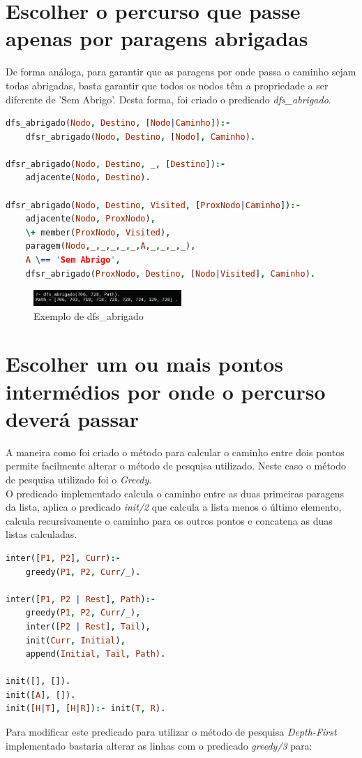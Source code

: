 \documentclass[a4paper]{report}
\begin{document}
\section{Escolher o percurso que passe apenas por paragens abrigadas}
De forma análoga, para garantir que as paragens por onde passa o caminho sejam
todas abrigadas, basta garantir que todos os nodos têm a propriedade a ser
diferente de 'Sem Abrigo'. Desta forma, foi criado o predicado
\textit{dfs\_abrigado}.\\

\begin{lstlisting}[language=Prolog]
dfs_abrigado(Nodo, Destino, [Nodo|Caminho]):-
    dfsr_abrigado(Nodo, Destino, [Nodo], Caminho).

dfsr_abrigado(Nodo, Destino, _, [Destino]):-
    adjacente(Nodo, Destino).

dfsr_abrigado(Nodo, Destino, Visited, [ProxNodo|Caminho]):-
    adjacente(Nodo, ProxNodo),
    \+ member(ProxNodo, Visited),
    paragem(Nodo,_,_,_,_,_,A,_,_,_,_),
    A \== 'Sem Abrigo',
    dfsr_abrigado(ProxNodo, Destino, [Nodo|Visited], Caminho).
\end{lstlisting}

\begin{figure}[H]
    \centering 
    \includegraphics[width=0.5\textwidth]{images/dfs_abrigado.png}
    \caption{Exemplo de dfs\_abrigado}
\end{figure}

\section{Escolher um ou mais pontos intermédios por onde o percurso deverá passar}
A maneira como foi criado o método para calcular o caminho entre dois pontos
permite facilmente alterar o método de pesquisa utilizado. Neste caso o método
de pesquisa utilizado foi o \textit{Greedy}.\\
O predicado implementado calcula o caminho entre as duas primeiras paragens da
lista, aplica o predicado \textit{init/2} que calcula a lista menos o último
elemento, calcula recursivamente o caminho para os outros pontos e concatena as
duas listas calculadas.

\begin{lstlisting}[language=Prolog]
inter([P1, P2], Curr):-
    greedy(P1, P2, Curr/_).

inter([P1, P2 | Rest], Path):-
    greedy(P1, P2, Curr/_),
    inter([P2 | Rest], Tail),
    init(Curr, Initial),
    append(Initial, Tail, Path).

init([], []).
init([A], []).
init([H|T], [H|R]):- init(T, R).
\end{lstlisting}
Para modificar este predicado para utilizar o método de pesquisa
\textit{Depth-First} implementado bastaria alterar as linhas com o predicado
\textit{greedy/3} para:
\end{document}
